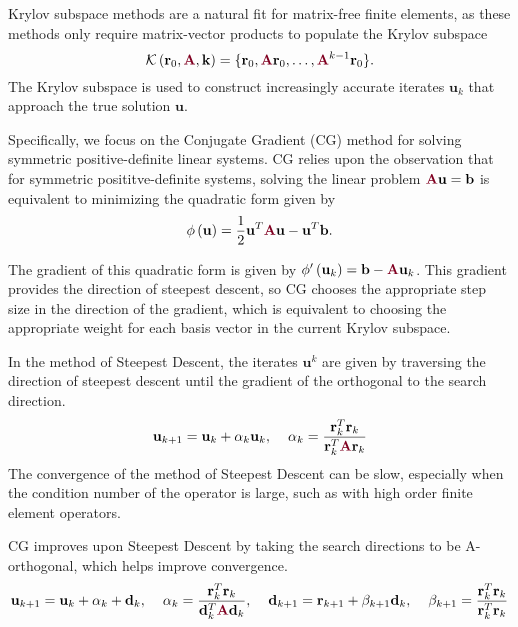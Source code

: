 Krylov subspace methods are a natural fit for matrix-free finite elements, as these methods only require matrix-vector products to populate the Krylov subspace
\begin{equation}
\mathcal{K} \left( \mathbf{r}_0, {\color{burgundy}\mathbf{A}}, \mathbf{k} \right) = \lbrace \mathbf{r}_0, {\color{burgundy}\mathbf{A}} \mathbf{r}_0, \dots, {\color{burgundy}\mathbf{A}}^{k - 1} \mathbf{r}_0 \rbrace.
\label{krylov_space}
\end{equation}
The Krylov subspace is used to construct increasingly accurate iterates $\mathbf{u}_k$ that approach the true solution $\mathbf{u}$.

Specifically, we focus on the Conjugate Gradient (CG) method \cite{hestenes1952methods, shewchuk1994introduction} for solving symmetric positive-definite linear systems.
CG relies upon the observation that for symmetric posititve-definite systems, solving the linear problem ${\color{burgundy}\mathbf{A}} \mathbf{u} = \mathbf{b}$ is equivalent to minimizing the quadratic form given by
\begin{equation}
\phi \left( \mathbf{u} \right) = \frac{1}{2} \mathbf{u}^T {\color{burgundy}\mathbf{A}} \mathbf{u} - \mathbf{u}^T \mathbf{b}.
\end{equation}

The gradient of this quadratic form is given by $\phi' \left( \mathbf{u}_k \right) = \mathbf{b} - {\color{burgundy}\mathbf{A}} \mathbf{u}_k$.
This gradient provides the direction of steepest descent, so CG chooses the appropriate step size in the direction of the gradient, which is equivalent to choosing the appropriate weight for each basis vector in the current Krylov subspace.

In the method of Steepest Descent, the iterates $\mathbf{u}^k$ are given by traversing the direction of steepest descent until the gradient of the orthogonal to the search direction.
\begin{equation}
\mathbf{u}_{k + 1} = \mathbf{u}_k + \alpha_k \mathbf{u}_k, \hspace{4mm}
\alpha_k = \frac{\mathbf{r}_k^T \mathbf{r}_k}{\mathbf{r}_k^T {\color{burgundy}\mathbf{A}} \mathbf{r}_k}
\end{equation}
The convergence of the method of Steepest Descent can be slow, especially when the condition number of the operator is large, such as with high order finite element operators.

CG improves upon Steepest Descent by taking the search directions to be A-orthogonal, which helps improve convergence.
\begin{equation}
\mathbf{u}_{k + 1} = \mathbf{u}_k + \alpha_k + \mathbf{d}_k, \hspace{4mm}
\alpha_k  = \frac{\mathbf{r}_k^T \mathbf{r}_k}{\mathbf{d}_k^T {\color{burgundy}\mathbf{A}} \mathbf{d}_k}, \hspace{4mm}
\mathbf{d}_{k + 1} = \mathbf{r}_{k + 1} + \beta_{k + 1} \mathbf{d}_k, \hspace{4mm}
\beta_{k + 1} = \frac{\mathbf{r}_k^T \mathbf{r}_k}{\mathbf{r}_k^T \mathbf{r}_k}
\end{equation}

